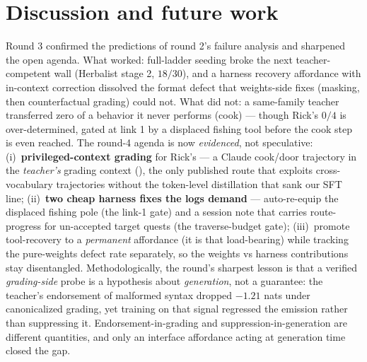 \documentclass[11pt]{article}
\begin{document}
\section{Discussion and future work}
Round 3 confirmed the predictions of round 2's failure analysis and sharpened the open agenda.
What worked: full-ladder seeding broke the next teacher-competent wall (Herbalist stage 2,
$18/30$), and a harness recovery affordance with in-context correction dissolved the format defect
that weights-side fixes (masking, then counterfactual grading) could not. What did not: a same-family teacher transferred zero
of a behavior it never performs (cook) --- though Rick's $0/4$ is over-determined, gated at link 1
by a displaced fishing tool before the cook step is even reached. The round-4 agenda is now \emph{evidenced}, not speculative: (i)~\textbf{privileged-context
grading} for Rick's --- a Claude cook/door trajectory in the \emph{teacher's} grading context
(\cite{pidistill,opsd}), the only published route that exploits cross-vocabulary trajectories
without the token-level distillation that sank our SFT line; (ii)~\textbf{two cheap harness fixes
the logs demand} --- auto-re-equip the displaced fishing pole (the link-1 gate) and a session note
that carries route-progress for un-accepted target quests (the traverse-budget gate);
(iii)~promote tool-recovery to a \emph{permanent} affordance (it is that load-bearing) while
tracking the pure-weights defect rate separately, so the weights vs harness contributions stay
disentangled. Methodologically, the round's sharpest lesson is that a verified \emph{grading-side}
probe is a hypothesis about \emph{generation}, not a guarantee: the teacher's endorsement of
malformed syntax dropped $-1.21$ nats under canonicalized grading, yet training on that signal
regressed the emission rather than suppressing it. Endorsement-in-grading and
suppression-in-generation are different quantities, and only an interface affordance acting at
generation time closed the gap.
\end{document}
